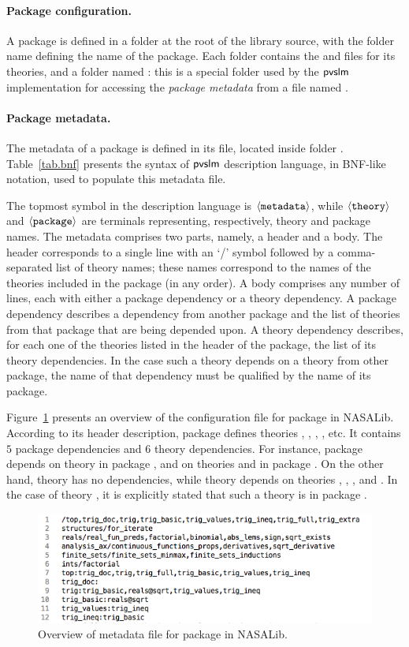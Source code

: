 \paragraph{Package configuration.}
A package is defined in a folder at the root of the library source,
with the folder name defining the name of the package. Each folder
contains the  and  files for its theories, and a
folder named : this is a special folder used by the
$\textsf{pvslm}$ implementation for accessing the {\em package metadata} from
a file named .

\paragraph{Package metadata.} The metadata of a package is defined
in its  file, located inside folder
. Table~\ref{tab.bnf} presents the syntax of $\textsf{pvslm}$
description language, in BNF-like notation, used to populate this
metadata file.

The topmost symbol in the description language is
$\langle{\texttt{metadata}}\rangle$, while $\langle{\texttt{theory}}\rangle$ and
$\langle{\texttt{package}}\rangle$ are terminals representing, respectively,
theory and package names. The metadata comprises two parts, namely, a
header and a body. The header corresponds to a single line with an `/'
symbol followed by a comma-separated list of theory names; these names
correspond to the names of the theories included in the package (in
any order). A body comprises any number of lines, each with either a
package dependency or a theory dependency. A package dependency
describes a dependency from another package and the list of theories
from that package that are being depended upon. A theory dependency
describes, for each one of the theories listed in the header of the
package, the list of its theory dependencies. In the case such a
theory depends on a theory from other package, the name of that
dependency must be qualified by the name of its package.

Figure~\ref{fig.top} presents an overview of the configuration file
for package  in NASALib. According to its header
description, package  defines theories ,
, , , etc. It contains $5$
package dependencies and $6$ theory dependencies. For instance,
package  depends on theory  in package
, and on theories  and
 in package . On the
other hand, theory  has no dependencies, while theory
 depends on theories , ,
, and . In the case of theory
, it is explicitly stated that such a theory is in package
.

\begin{figure}[pthb]
  \centering
  \includegraphics[width=12cm]{images/top.png}
  \caption{Overview of metadata file for package  in NASALib.}
  \label{fig.top}
\end{figure}

